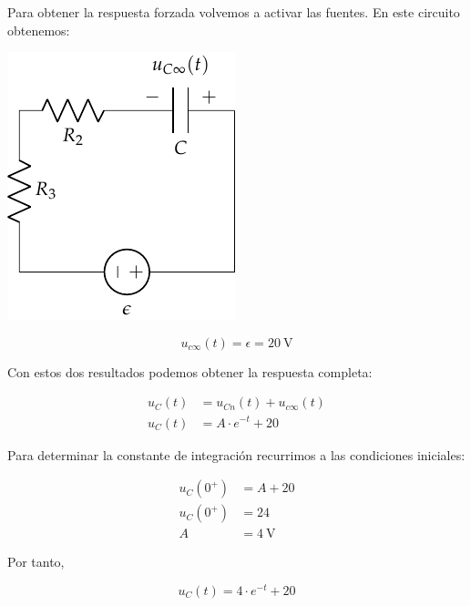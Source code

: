 \documentclass[12pt]{article}
\begin{document}
Para obtener la respuesta forzada volvemos a activar las fuentes. En este circuito obtenemos:

\begin{minipage}{0.3\textwidth}
\includegraphics{figs/FM_4_3_forzada}
\end{minipage}
\begin{minipage}{0.7\textwidth}
  \begin{equation*}
    u_{c\infty}(t) = \epsilon = \SI{20}{\volt}
  \end{equation*}
\end{minipage}

Con estos dos resultados podemos obtener la respuesta completa:

\begin{align*}
  u_C(t) &= u_{Cn}(t) + u_{c\infty}(t)\\
  u_C(t) &= A \cdot e^{-t} + 20
\end{align*}

Para determinar la constante de integración recurrimos a las condiciones iniciales:

\begin{align*}
  u_C(0^+) &= A + 20\\
  u_C(0^+) &= 24\\
  A &= \SI{4}{\volt}
\end{align*}

Por tanto,

\begin{equation*}
  u_C(t) = 4 \cdot e^{-t} + 20
\end{equation*}

\clearpage

\subsection{}
\end{document}
